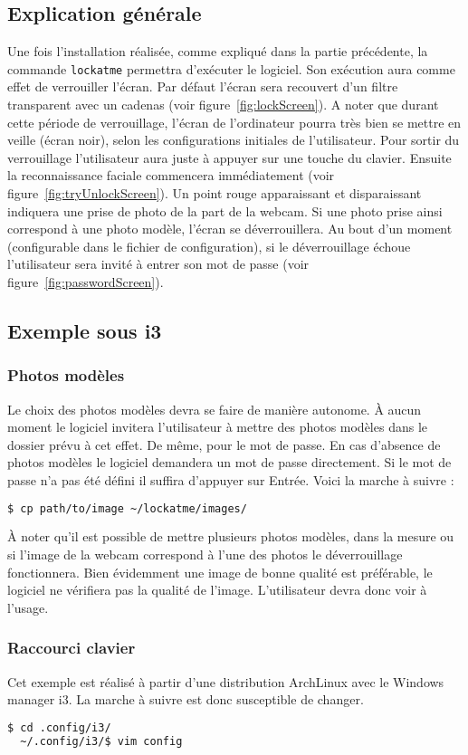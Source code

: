 \subsection{Explication générale}
Une fois l'installation réalisée, comme expliqué dans la partie précédente,
la commande \verb|lockatme| permettra d'exécuter le logiciel. Son
exécution aura comme effet de verrouiller l'écran. Par défaut l'écran sera
recouvert d'un filtre transparent avec un cadenas (voir figure~\ref{fig:lockScreen}).
A noter que durant cette période de verrouillage, l'écran de l'ordinateur pourra très bien
se mettre en veille (écran noir), selon les configurations initiales de
l'utilisateur.
Pour sortir du verrouillage l'utilisateur aura juste à appuyer sur une touche
du clavier. Ensuite la reconnaissance faciale commencera immédiatement (voir
figure~\ref{fig:tryUnlockScreen}).
Un point rouge apparaissant et disparaissant indiquera une prise de
photo de la part de la webcam. Si une photo prise ainsi correspond à une photo
modèle, l'écran se déverrouillera. Au bout d'un moment (configurable dans le
fichier de configuration), si le déverrouillage échoue l'utilisateur sera invité à
entrer son mot de passe (voir figure~\ref{fig:passwordScreen}).

\newpage
\subsection{Exemple sous i3}
\subsubsection{Photos modèles}
Le choix des photos modèles devra se faire de manière autonome. À aucun moment
le logiciel invitera l'utilisateur à mettre des photos modèles dans le dossier
prévu à cet effet. De même, pour le mot de passe. En cas d'absence de photos
modèles le logiciel demandera un mot de passe directement. Si le mot de passe
n'a pas été défini il suffira d'appuyer sur Entrée.
Voici la marche à suivre :
\begin{lstlisting}[language=bash]
  $ cp path/to/image ~/lockatme/images/
\end{lstlisting}
À noter qu'il est possible de mettre plusieurs photos modèles, dans la mesure
ou si l'image de la webcam correspond à l'une des photos le déverrouillage
fonctionnera. Bien évidemment une image de bonne qualité est préférable, le logiciel ne
vérifiera pas la qualité de l'image. L'utilisateur devra donc voir à l'usage.

\subsubsection{Raccourci clavier}
Cet exemple est réalisé à partir d'une distribution ArchLinux avec le Windows
manager i3. La marche à suivre est donc susceptible de changer.
\begin{lstlisting}[language=bash]
  $ cd .config/i3/
  ~/.config/i3/$ vim config
\end{lstlisting}

